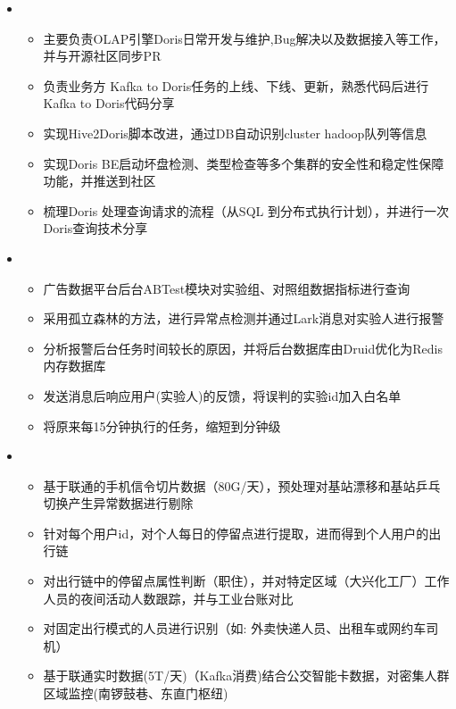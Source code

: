 \begin{itemize}[leftmargin=*]
      \item 
      {\small
      \begin{itemize}
        \item 主要负责OLAP引擎Doris日常开发与维护,Bug解决以及数据接入等工作，并与开源社区同步PR
        \item 负责业务方 Kafka to Doris任务的上线、下线、更新，熟悉代码后进行Kafka to Doris代码分享
        \item 实现Hive2Doris脚本改进，通过DB自动识别cluster hadoop队列等信息
        \item 实现Doris BE启动坏盘检测、类型检查等多个集群的安全性和稳定性保障功能，并推送到社区
        \item 梳理Doris 处理查询请求的流程（从SQL 到分布式执行计划），并进行一次Doris查询技术分享
      \end{itemize} 
      }

      \item 
      {\small
      \begin{itemize}
        \item 广告数据平台后台ABTest模块对实验组、对照组数据指标进行查询
        \item 采用孤立森林的方法，进行异常点检测并通过Lark消息对实验人进行报警
        \item 分析报警后台任务时间较长的原因，并将后台数据库由Druid优化为Redis内存数据库
        \item 发送消息后响应用户(实验人)的反馈，将误判的实验id加入白名单
        \item 将原来每15分钟执行的任务，缩短到分钟级
      \end{itemize} 
      }

      \item 
      {\small
      \begin{itemize}
        \item 基于联通的手机信令切片数据（80G/天），预处理对基站漂移和基站乒乓切换产生异常数据进行剔除
        \item 针对每个用户id，对个人每日的停留点进行提取，进而得到个人用户的出行链
        \item 对出行链中的停留点属性判断（职住），并对特定区域（大兴化工厂）工作人员的夜间活动人数跟踪，并与工业台账对比
        \item 对固定出行模式的人员进行识别（如: 外卖快递人员、出租车或网约车司机）
        \item 基于联通实时数据(5T/天)（Kafka消费)结合公交智能卡数据，对密集人群区域监控(南锣鼓巷、东直门枢纽)
      \end{itemize}

      }
  \end{itemize}